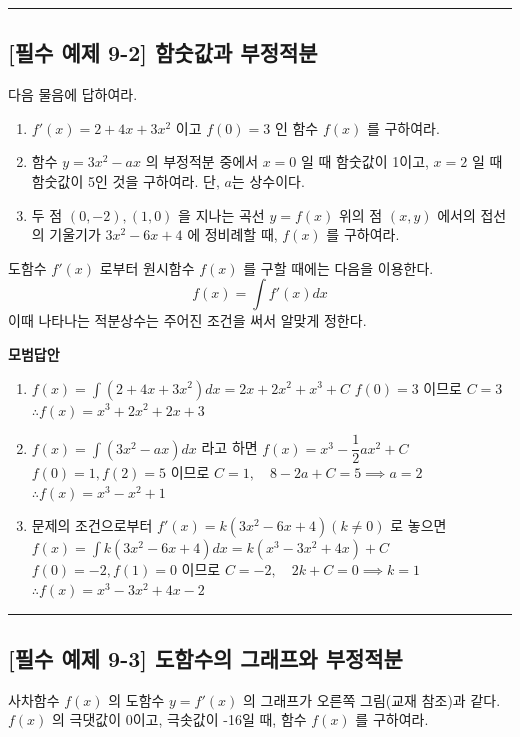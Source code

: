 \documentclass[a4paper,11pt]{article}
\begin{document}
\vspace{0.5cm}
\hrule
\vspace{0.5cm}

\subsection*{[필수 예제 9-2] 함숫값과 부정적분}
다음 물음에 답하여라.
\begin{enumerate}
    \item $f'(x)=2+4x+3x^2$ 이고 $f(0)=3$ 인 함수 $f(x)$ 를 구하여라.
    \item 함수 $y=3x^2-ax$ 의 부정적분 중에서 $x=0$ 일 때 함숫값이 1이고, $x=2$ 일 때 함숫값이 5인 것을 구하여라. 단, $a$는 상수이다.
    \item 두 점 $(0, -2), (1, 0)$ 을 지나는 곡선 $y=f(x)$ 위의 점 $(x, y)$ 에서의 접선의 기울기가 $3x^2-6x+4$ 에 정비례할 때, $f(x)$ 를 구하여라.
\end{enumerate}

\begin{studybox}
도함수 $f'(x)$ 로부터 원시함수 $f(x)$ 를 구할 때에는 다음을 이용한다.
\[ f(x) = \int f'(x) dx \]
이때 나타나는 적분상수는 주어진 조건을 써서 알맞게 정한다.
\end{studybox}

\textbf{모범답안}
\begin{enumerate}
    \item $f(x) = \int (2+4x+3x^2) dx = 2x + 2x^2 + x^3 + C$
    $f(0)=3$ 이므로 $C=3$
    $\therefore f(x) = x^3 + 2x^2 + 2x + 3$
    \item $f(x) = \int (3x^2-ax) dx$ 라고 하면 $f(x) = x^3 - \dfrac{1}{2}ax^2 + C$
    $f(0)=1, f(2)=5$ 이므로 $C=1, \quad 8-2a+C=5 \implies a=2$
    $\therefore f(x) = x^3 - x^2 + 1$
    \item 문제의 조건으로부터 $f'(x) = k(3x^2-6x+4) (k \ne 0)$ 로 놓으면
    $f(x) = \int k(3x^2-6x+4) dx = k(x^3-3x^2+4x) + C$
    $f(0)=-2, f(1)=0$ 이므로 $C=-2, \quad 2k+C=0 \implies k=1$
    $\therefore f(x) = x^3 - 3x^2 + 4x - 2$
\end{enumerate}

\vspace{0.5cm}
\hrule
\vspace{0.5cm}

\subsection*{[필수 예제 9-3] 도함수의 그래프와 부정적분}
사차함수 $f(x)$ 의 도함수 $y=f'(x)$ 의 그래프가 오른쪽 그림(교재 참조)과 같다. $f(x)$ 의 극댓값이 0이고, 극솟값이 -16일 때, 함수 $f(x)$ 를 구하여라.
\end{document}
